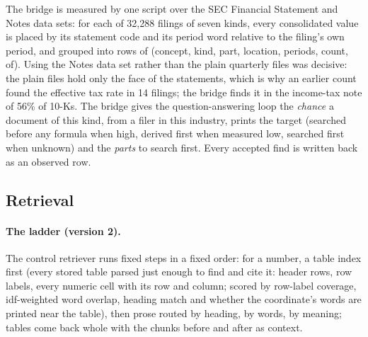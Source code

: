 The bridge is measured by one script over the SEC Financial Statement and Notes data sets: for each of 32,288 filings of seven kinds, every consolidated value is placed by its statement code and its period word relative to the filing's own period, and grouped into rows of (concept, kind, part, location, periods, count, of). Using the Notes data set rather than the plain quarterly files was decisive: the plain files hold only the face of the statements, which is why an earlier count found the effective tax rate in 14 filings; the bridge finds it in the income-tax note of 56\% of 10-Ks. The bridge gives the question-answering loop the \emph{chance} a document of this kind, from a filer in this industry, prints the target (searched before any formula when high, derived first when measured low, searched first when unknown) and the \emph{parts} to search first. Every accepted find is written back as an observed row.

\subsection{Retrieval}
\label{sec:impl-retrieval}

\paragraph{The ladder (version 2).} The control retriever runs fixed steps in a fixed order: for a number, a table index first (every stored table parsed just enough to find and cite it: header rows, row labels, every numeric cell with its row and column; scored by row-label coverage, idf-weighted word overlap, heading match and whether the coordinate's words are printed near the table), then prose routed by heading, by words, by meaning; tables come back whole with the chunks before and after as context.

